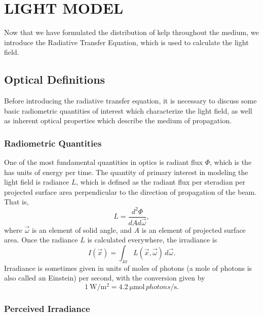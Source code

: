 \chapter{LIGHT MODEL}
\label{chap:light}

Now that we have formulated the distribution of kelp throughout the medium, we introduce the Radiative Transfer Equation, which is used to calculate the light field.

\section{Optical Definitions}
Before introducing the radiative transfer equation, it is necessary to discuss some basic radiometric quantities of interest which characterize the light field, as well as inherent optical properties which describe the medium of propagation.

\subsection{Radiometric Quantities}

One of the most fundamental quantities in optics is radiant flux $\Phi$, which is the has units of energy per time.
The quantity of primary interest in modeling the light field is radiance $L$, which is defined as the radiant flux per steradian per projected surface area perpendicular to the direction of propagation of the beam.
That is,
\begin{equation*}
	L = \frac{d^2\Phi}{dA d\vec{\omega}},
\end{equation*}
where $\vec{\omega}$ is an element of solid angle, and $A$ is an element of projected surface area.
Once the radiance $L$ is calculated everywhere, the irradiance is
\begin{equation*}
  I(\vec{x}) = \int_{4\pi}L(\vec{x},\vec{\omega})\, d\vec{\omega}.
\end{equation*}
Irradiance is sometimes given in units of moles of photons (a mole of photons is also called an Einstein) per second, with the conversion \cite{mobley_light_1994} given by
\begin{equation}
  \SI{1}{\W\per\m^2} = \SI{4.2}{\micro\mole \,photons\per\second}.
  \label{eqn:watts_photons}
\end{equation}

\subsection{Perceived Irradiance}
\label{sec:perceived_irrad}

